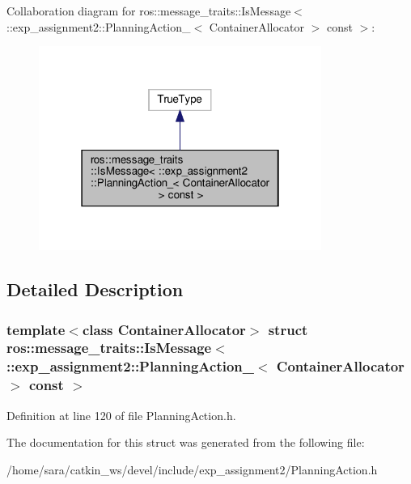 Collaboration diagram for ros\+:\+:message\+\_\+traits\+:\+:Is\+Message$<$ \+:\+:exp\+\_\+assignment2\+:\+:Planning\+Action\+\_\+$<$ Container\+Allocator $>$ const $>$\+:
\nopagebreak
\begin{figure}[H]
\begin{center}
\leavevmode
\includegraphics[width=262pt]{structros_1_1message__traits_1_1IsMessage_3_01_1_1exp__assignment2_1_1PlanningAction___3_01Contade12470ba970bb90c1eefa0c86f204b4}
\end{center}
\end{figure}


\subsection{Detailed Description}
\subsubsection*{template$<$class Container\+Allocator$>$\newline
struct ros\+::message\+\_\+traits\+::\+Is\+Message$<$ \+::exp\+\_\+assignment2\+::\+Planning\+Action\+\_\+$<$ Container\+Allocator $>$ const $>$}



Definition at line 120 of file Planning\+Action.\+h.



The documentation for this struct was generated from the following file\+:\begin{DoxyCompactItemize}
\item 
/home/sara/catkin\+\_\+ws/devel/include/exp\+\_\+assignment2/Planning\+Action.\+h\end{DoxyCompactItemize}
